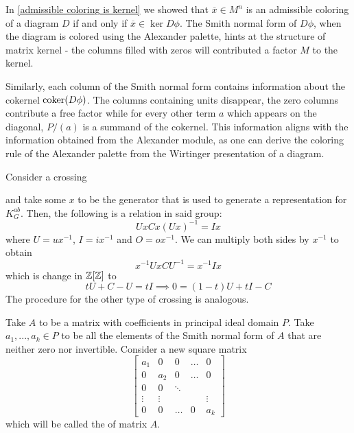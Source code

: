 In \cref{admissible coloring is kernel} we showed that $\overline{x}\in M^n$ is an admissible coloring of a diagram $D$ if and only if $\overline{x}\in\ker D\phi$. The Smith normal form of $D\phi$, when the diagram is colored using the Alexander palette, hints at the structure of matrix kernel - the columns filled with zeros will contributed a factor $M$ to the kernel. 

Similarly, each column of the Smith normal form contains information about the cokernel $\operatorname{coker}(D\phi)$. The columns containing units disappear, the zero columns contribute a free factor while for every other term $a$ which appears on the diagonal, $P/(a)$ is a summand of the cokernel.
This information aligns with the information obtained from the Alexander module, as one can derive the coloring rule of the Alexander palette from the Wirtinger presentation of a diagram.

Consider a crossing
\begin{center}
\end{center}
and take some $x$ to be the generator that is used to generate a representation for $K_G^{ab}$. Then, the following is a relation in said group:
$$UxCx(Ux)^{-1}=Ix$$
where $U=ux^{-1}$, $I=ix^{-1}$ and $O=ox^{-1}$. 
We can multiply both sides by $x^{-1}$ to obtain
$$x^{-1}UxCU^{-1}=x^{-1}Ix$$
which is change in $\operatorname{\mathbb{Z}}[\operatorname{\mathbb{Z}}]$ to
$$
tU+C-U=tI\implies 0=(1-t)U+tI-C
$$
The procedure for the other type of crossing is analogous.





\begin{definition}\label{reduced normal form def}
  Take $A$ to be a matrix with coefficients in principal ideal domain $P$. Take $a_1,...,a_k\in P$ to be all the elements of the Smith normal form of $A$ that are neither zero nor invertible. Consider a new square matrix 
  $$
  \begin{bmatrix}
    a_1 & 0 & 0 & \hdots & 0\\ 
    0 & a_2 & 0 & \hdots & 0 \\ 
    0 & 0 & \ddots & &  \\ 
    \vdots & \vdots & & & \vdots \\ 
    0 & 0 & \hdots & 0 & a_k
  \end{bmatrix}
  $$
  which will be called the  of matrix $A$.
\end{definition}

